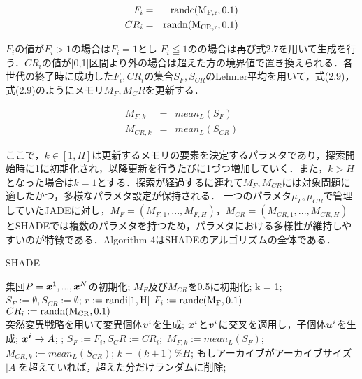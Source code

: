 \documentclass[a4paper,11pt,oneside,openany]{jsbook}
\def\vector#1{\mbox{\boldmath $#1$}}
\begin{document}
\begin{eqnarray}
  F_i & = & \rm{randc}(M_{F,r}, 0.1) \\
  CR_i & = & \rm{randn}(M_{CR,r}, 0.1)
\end{eqnarray}

$F_i$の値が$F_i>1$の場合は$F_i = 1$とし $F_i\leqq1の$の場合は再び式2.7を用いて生成を行う．$CR_i$の値が[0,1]区間より外の場合は超えた方の境界値で置き換えられる．各世代の終了時に成功した$F_i,CR_i$の集合$S_F,S_{CR}$のLehmer平均を用いて，式(2.9)，式(2.9)のようにメモリ$M_F,M_CR$を更新する．

\begin{eqnarray}
  M_{F,k} & = & mean_L(S_F)\\
  M_{CR,k} & = & mean_L(S_{CR})
\end{eqnarray}

ここで，$k \in [1,H]$は更新するメモリの要素を決定するパラメタであり，探索開始時に1に初期化され，以降更新を行うたびに1づつ増加していく．また，$k > H$となった場合は$k = 1$とする．探索が経過するに連れて$M_F,M_{CR}$には対象問題に適したかつ，多様なパラメタ設定が保持される．
一つのパラメタ$\mu _F, \mu _{CR}$で管理していたJADEに対し，$M_F = (M_{F,1},...,M_{F,H})$，$M_{CR}= (M_{CR,1},...,M_{CR,H})$とSHADEでは複数のパラメタを持つため，パラメタにおける多様性が維持しやすいのが特徴である．Algorithm 4はSHADEのアルゴリズムの全体である．

\begin{algorithm}
\caption{SHADE}
\label{alg:pbnf}
\begin{algorithmic}
\STATE 集団$P={\vector{x}^1,...,\vector{x}^N}$の初期化;
\STATE $M _F$及び$M _{CR}$を0.5に初期化;
\STATE k = 1;
    \STATE $S_F := \emptyset, S_{CR} := \emptyset$;
        \STATE $r := \rm{randi}[1,H]$
        \STATE $F_i := \rm{randc}(M_F, 0.1)$ \\
        \STATE $CR_i := \rm{randn}(M_{CR}, 0.1)$ \\
        \STATE 突然変異戦略を用いて変異個体{$\vector{v}^i$}を生成;
        \STATE $\vector{x}^i$と$\vector{v}^i$に交叉を適用し，子個体$\vector{u}^i$を生成;
     \ENDFOR
        \IF {$f(\vector{u}^i) \leqq f(\vector{x}^i)$}
            \STATE $\vector{x^i} \rightarrow {A}$;
            \STATE {$\vector{x}^i=\vector{u}^i$};
            \STATE $S_F := {F_i}, S_CR := {CR_i};$
        \ENDIF
    \ENDFOR
        \STATE $M_{F,k}  :=  mean_L(S_F)$;
        \STATE $M_{CR,k}  :=  mean_L(S_{CR})$;
        \STATE $k = (k+1) \% H$;
    \ENDIF
    \STATE もしアーカイブがアーカイブサイズ$|A|$を超えていれば，超えた分だけランダムに削除;
\ENDWHILE
\end{algorithmic}
\end{algorithm}
\end{document}
